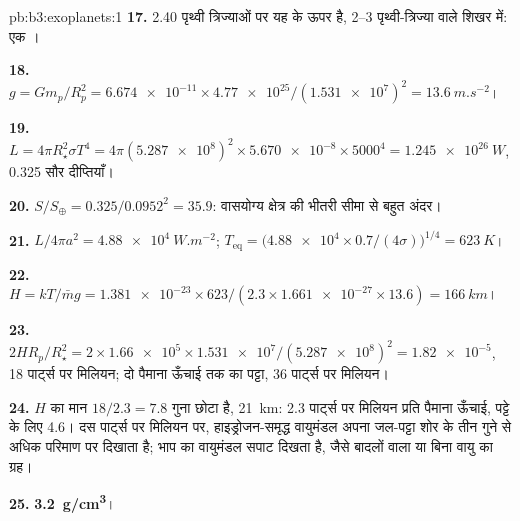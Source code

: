 \begin{solution}{pb:b3:exoplanets:1}
\textbf{17.} 2.40 पृथ्वी त्रिज्याओं पर यह  के ऊपर है, 2--3 पृथ्वी-त्रिज्या
वाले शिखर में: एक ।

\textbf{18.} $g = Gm_p/R_p^2 = \num{6.674e-11}\times\num{4.77e25}/(\num{1.531e7})^2 =
\qty{13.6}{m.s^{-2}}$।

\textbf{19.} $L = 4\pi R_\star^2\sigma T^4 = 4\pi(\num{5.287e8})^2\times\num{5.670e-8}
\times5000^4 = \qty{1.245e26}{W}$, 0.325 सौर दीप्तियाँ।

\textbf{20.} $S/S_\oplus = 0.325/0.0952^2 = 35.9$: वासयोग्य क्षेत्र की भीतरी
सीमा से बहुत अंदर।

\textbf{21.} $L/4\pi a^2 = \qty{4.88e4}{W.m^{-2}}$; $T_\mathrm{eq} =
\bigl(\num{4.88e4}\times0.7/(4\sigma)\bigr)^{1/4} = \qty{623}{K}$।

\textbf{22.} $H = kT/\bar m g = \num{1.381e-23}\times623/(2.3\times\num{1.661e-27}
\times13.6) = \qty{166}{km}$।

\textbf{23.} $2HR_p/R_\star^2 = 2\times\num{1.66e5}\times\num{1.531e7}/
(\num{5.287e8})^2 = \num{1.82e-5}$, 18 पार्ट्स पर मिलियन; दो
पैमाना ऊँचाई तक का पट्टा, 36 पार्ट्स पर मिलियन।

\textbf{24.} $H$ का मान $18/2.3 = 7.8$ गुना छोटा है, \qty{21}{km}: 2.3 पार्ट्स पर
मिलियन प्रति पैमाना ऊँचाई, पट्टे के लिए 4.6। दस पार्ट्स पर मिलियन पर,
हाइड्रोजन-समृद्ध वायुमंडल अपना जल-पट्टा शोर के तीन गुने से अधिक
परिमाण पर दिखाता है; भाप का वायुमंडल सपाट दिखता है, जैसे बादलों वाला
या बिना वायु का ग्रह।

\textbf{25.} \textbf{\qty[text-series-to-math=true]{3.2}{g/cm^3}}।
\end{solution}
